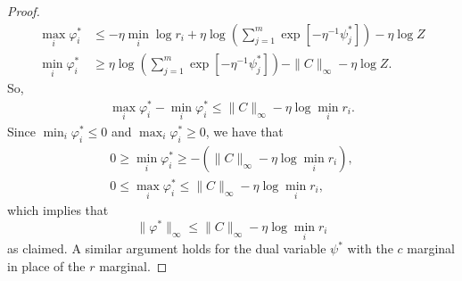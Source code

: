 \documentclass[10pt,a4paper]{amsart}
\begin{document}
\begin{proof}
\begin{align*}
        \max_{i}\varphi_i^*&\leq -\eta \min_i\log r_i+\eta \log\left(\sum_{j=1}^m\exp[-\eta ^{-1}\psi^*_j]\right)-\eta \log Z\\
        \min_{i}\varphi_i^*&\geq  \eta \log\left(\sum_{j=1}^m\exp[-\eta ^{-1}\psi^*_j]\right) - \|C\|_\infty - \eta \log Z.
    \end{align*}
    So,
    \begin{align*}
        \max_{i}\varphi_i^*-\min_{i}\varphi_i^*\leq \|C\|_\infty-\eta \log\min_{i} r_i.
    \end{align*}
    Since $\min_{i}\varphi_i^*\leq 0$ and $\max_{i}\varphi_i^*\geq 0$, we have that 
    \begin{align*}
        0\geq\min_{i}\varphi_i^*\geq -(\|C\|_\infty-\eta \log\min_{i} r_i),\\
        0\leq\max_{i}\varphi_i^*\leq \|C\|_\infty-\eta \log\min_{i} r_i,
    \end{align*}
    which implies that 
    \[
    \|\varphi^*\|_\infty \leq \|C\|_\infty-\eta \log\min_{i} r_i
    \]
    as claimed. A similar argument holds for the dual variable $\psi^*$ with the $c$ marginal in place of the $r$ marginal.  
\end{proof}
\end{document}
